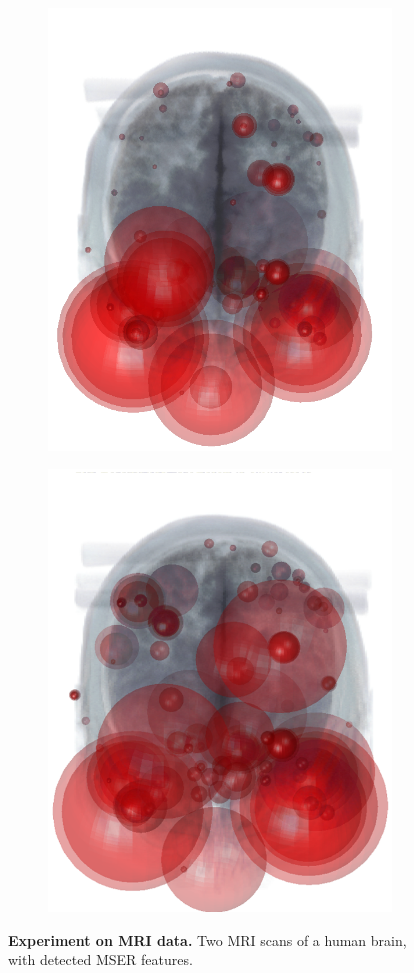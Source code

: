 \begin{figure}[ht]
	\centering 
	\begin{subfigure}[t]{0.35\linewidth} \centering 
		\includegraphics[width=0.8\linewidth]{./fig/eval/mri.png}
		\label{fig/eval/mri1}
	\end{subfigure}
	\begin{subfigure}[t]{0.35\linewidth} \centering 
		\includegraphics[width=0.8\linewidth]{./fig/eval/mri2.png}
		\label{fig/eval/mri2}
	\end{subfigure}
	\caption{\textbf{Experiment on MRI data.} Two MRI scans of a human brain, with detected MSER features.}
	\label{fig/eval/mri}
\end{figure}

